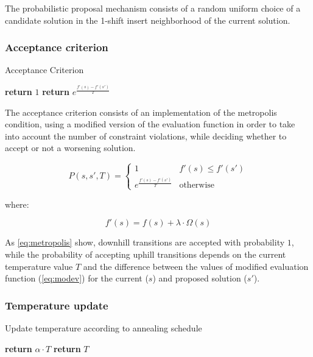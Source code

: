 \begin{homeworkProblem}
The probabilistic proposal mechanism consists of a random uniform choice of a candidate solution in the 1-shift insert neighborhood of the current solution.

\subsubsection{Acceptance criterion}
\begin{algorithm}[H]
\caption{Acceptance Criterion}
\label{saTSPTW}
\begin{algorithmic}
  \State \textbf{return} $1$
\Else
  \State \textbf{return} $e^{\frac{f'(s)-f'(s')}{T}}$
\EndIf
\EndProcedure
\end{algorithmic}
\end{algorithm}

The acceptance criterion consists of an implementation of the metropolis condition, using a modified version of the evaluation function in order to take into account the number of constraint violations, while deciding whether to accept or not a worsening solution.

\begin{equation} \label{eq:metropolis}
  P(s,s',T) = \begin{cases}
               1 & f'(s) \le f'(s') \\
               e^{\frac{f'(s)-f'(s')}{T}} & \text{otherwise}
              \end{cases}
\end{equation}

where:

\begin{equation} \label{eq:modev}
  f'(s) = f(s) + \lambda \cdot \Omega(s)
\end{equation}

As \ref{eq:metropolis} show, downhill transitions are accepted with probability $1$, while the probability of accepting uphill transitions depends on the current temperature value $T$ and the difference between the values of modified evaluation function (\ref{eq:modev}) for the current ($s$) and proposed solution ($s'$).


\subsubsection{Temperature update}
\begin{algorithm}[H]
\caption{Update temperature according to annealing schedule}
\label{saTSPTW}
\begin{algorithmic}
    \State \textbf{return} $\alpha \cdot T$
  \Else
    \State \textbf{return} $T$
  \EndIf
\EndProcedure
\end{algorithmic}
\end{algorithm}


\end{homeworkProblem}
